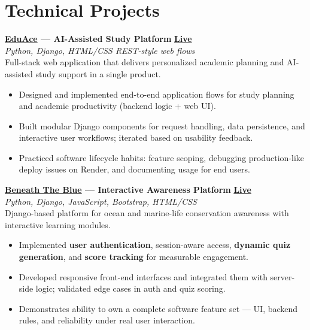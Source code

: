 \documentclass[a4paper,10pt]{article}
\begin{document}
\section{Technical Projects}
\vspace{0.8mm}
\noindent\textbf{\href{https://eduace.onrender.com/}{EduAce} --- AI-Assisted Study Platform}
\hfill \href{https://eduace.onrender.com/}{\textbf{\small Live}}\\
\textit{\small Python, Django, HTML/CSS \textbar{} REST-style web flows}\\[0.5mm]
Full-stack web application that delivers personalized academic planning and AI-assisted study support in a single product.
\begin{itemize}
  \item Designed and implemented end-to-end application flows for study planning and academic productivity (backend logic + web UI).
  \item Built modular Django components for request handling, data persistence, and interactive user workflows; iterated based on usability feedback.
  \item Practiced software lifecycle habits: feature scoping, debugging production-like deploy issues on Render, and documenting usage for end users.
\end{itemize}

\vspace{1mm}
\noindent\textbf{\href{https://beneath-the-blue-1-3c6o.onrender.com/}{Beneath The Blue} --- Interactive Awareness Platform}
\hfill \href{https://beneath-the-blue-1-3c6o.onrender.com/}{\textbf{\small Live}}\\
\textit{\small Python, Django, JavaScript, Bootstrap, HTML/CSS}\\[0.5mm]
Django-based platform for ocean and marine-life conservation awareness with interactive learning modules.
\begin{itemize}
  \item Implemented \textbf{user authentication}, session-aware access, \textbf{dynamic quiz generation}, and \textbf{score tracking} for measurable engagement.
  \item Developed responsive front-end interfaces and integrated them with server-side logic; validated edge cases in auth and quiz scoring.
  \item Demonstrates ability to own a complete software feature set --- UI, backend rules, and reliability under real user interaction.
\end{itemize}
\end{document}
